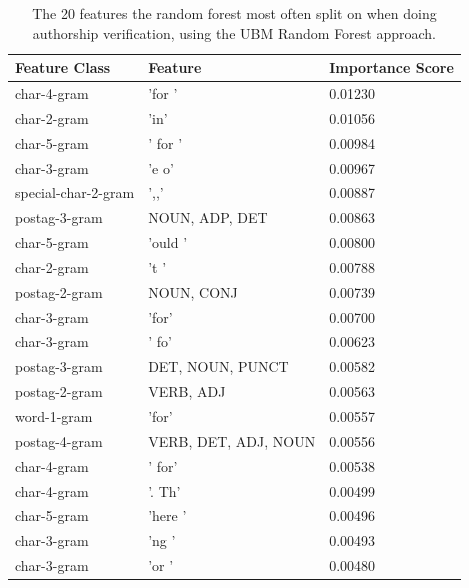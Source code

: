 \begin{table}
    \centering
    \begin{tabular}{lll}
        \textbf{Feature Class} & \textbf{Feature}     & \textbf{Importance Score} \\
        \hline
        char-4-gram            & 'for '               & 0.01230                   \\
        char-2-gram            & 'in'                 & 0.01056                   \\
        char-5-gram            & ' for '              & 0.00984                   \\
        char-3-gram            & 'e o'                & 0.00967                   \\
        special-char-2-gram    & ',,'                 & 0.00887                   \\
        postag-3-gram          & NOUN, ADP, DET       & 0.00863                   \\
        char-5-gram            & 'ould '              & 0.00800                   \\
        char-2-gram            & 't '                 & 0.00788                   \\
        postag-2-gram          & NOUN, CONJ           & 0.00739                   \\
        char-3-gram            & 'for'                & 0.00700                   \\
        char-3-gram            & ' fo'                & 0.00623                   \\
        postag-3-gram          & DET, NOUN, PUNCT     & 0.00582                   \\
        postag-2-gram          & VERB, ADJ            & 0.00563                   \\
        word-1-gram            & 'for'                & 0.00557                   \\
        postag-4-gram          & VERB, DET, ADJ, NOUN & 0.00556                   \\
        char-4-gram            & ' for'               & 0.00538                   \\
        char-4-gram            & '. Th'               & 0.00499                   \\
        char-5-gram            & 'here '              & 0.00496                   \\
        char-3-gram            & 'ng '                & 0.00493                   \\
        char-3-gram            & 'or '                & 0.00480
    \end{tabular}
    \caption{The 20 features the random forest most often split on when doing
    authorship verification, using the \gls{UBM} Random Forest approach.}
    \label{tab:feature_importance}
\end{table}

